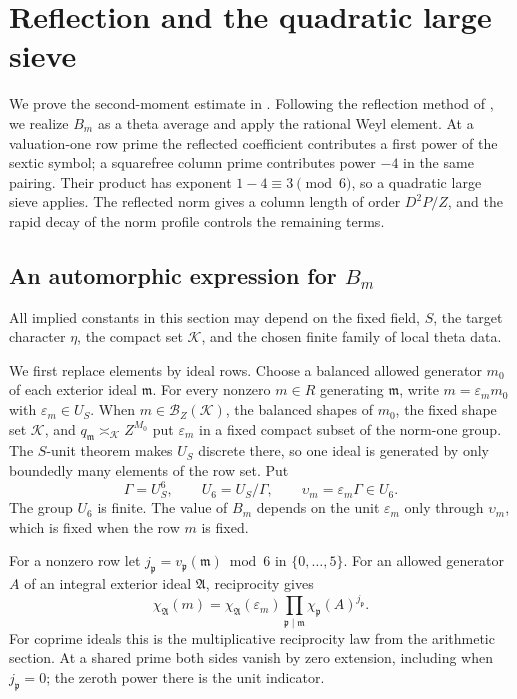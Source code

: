 \section{Reflection and the quadratic large sieve}\label{sec:reflection}

We prove the second-moment estimate in .  Following
the reflection method of \cite[Part~I, Sections~5--7]{QuasiRH}, we realize
\(B_m\) as a theta average and apply the rational Weyl element.  At a
valuation-one row prime the reflected coefficient contributes a first power
of the sextic symbol; a squarefree column prime contributes power \(-4\)
in the same pairing.  Their product has exponent \(1-4\equiv3\pmod6\),
so a quadratic large sieve applies.  The reflected norm gives a column
length of order \(D^2P/Z\), and the rapid decay of the norm profile controls
the remaining terms.

\subsection{An automorphic expression for \texorpdfstring{\(B_m\)}{B m}}

All implied constants in this section may depend on the fixed field, \(S\),
the target character \(\eta\), the compact set \(\mathscr K\), and the
chosen finite family of local theta data.

We first replace elements by ideal rows.  Choose a balanced allowed generator
\(m_0\) of each exterior ideal \(\mathfrak m\).  For every nonzero
\(m\in R\) generating \(\mathfrak m\), write
\(m=\varepsilon_m m_0\) with \(\varepsilon_m\in U_S\).  When
\(m\in\mathscr B_Z(\mathscr K)\), the balanced shapes of \(m_0\), the
fixed shape set \(\mathscr K\), and
\(q_{\mathfrak m}\asymp_{\mathscr K}Z^{M_0}\) put \(\varepsilon_m\) in a
fixed compact subset of the norm-one group.  The \(S\)-unit theorem makes
\(U_S\) discrete there, so one ideal is generated by only boundedly many
elements of the row set.  Put
\[
 \Gamma=U_S^6,\qquad U_6=U_S/\Gamma,\qquad
 \upsilon_m=\varepsilon_m\Gamma\in U_6.
\]
The group \(U_6\) is finite.  The value of \(B_m\) depends on the unit
\(\varepsilon_m\) only through \(\upsilon_m\), which is fixed when the row
\(m\) is fixed.

For a nonzero row let \(j_{\mathfrak p}=v_{\mathfrak p}(\mathfrak m)\bmod6\)
in \(\{0,\ldots,5\}\).  For an allowed generator \(A\) of an integral
exterior ideal \(\mathfrak A\), reciprocity gives
\begin{equation}\label{eq:reflection-moving-twist}
 \chi_{\mathfrak A}(m)
 =\chi_{\mathfrak A}(\varepsilon_m)
   \prod_{\mathfrak p\mid\mathfrak m}
       \chi_{\mathfrak p}(A)^{j_{\mathfrak p}}.
\end{equation}
For coprime ideals this is the multiplicative reciprocity law from the
arithmetic section.  At a shared prime both sides vanish by zero extension,
including when \(j_{\mathfrak p}=0\); the zeroth power there is the unit
indicator.

